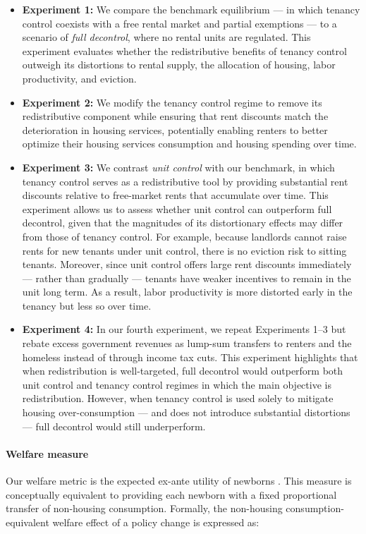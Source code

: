 \documentclass[parskip=full]{article}
\begin{document}
\begin{itemize}
    \item \textbf{Experiment 1:} We compare the benchmark equilibrium — in which tenancy control coexists with a free rental market and partial exemptions — to a scenario of \textit{full decontrol}, where no rental units are regulated. This experiment evaluates whether the redistributive benefits of tenancy control outweigh its distortions to rental supply, the allocation of housing, labor productivity, and eviction.
    \item \textbf{Experiment 2:} We modify the tenancy control regime to remove its redistributive component while ensuring that rent discounts match the deterioration in housing services, potentially enabling renters to better optimize their housing services consumption and housing spending over time.
    \item \textbf{Experiment 3:} We contrast \textit{unit control} with our benchmark, in which tenancy control serves as a redistributive tool by providing substantial rent discounts relative to free-market rents that accumulate over time. This experiment allows us to assess whether unit control can outperform full decontrol, given that the magnitudes of its distortionary effects may differ from those of tenancy control. For example, because landlords cannot raise rents for new tenants under unit control, there is no eviction risk to sitting tenants. Moreover, since unit control offers large rent discounts immediately — rather than gradually — tenants have weaker incentives to remain in the unit long term. As a result, labor productivity is more distorted early in the tenancy but less so over time.
    \item \textbf{Experiment 4:} In our fourth experiment, we repeat Experiments 1--3 but rebate excess government revenues as lump-sum transfers to renters and the homeless instead of through income tax cuts. This experiment highlights that when redistribution is well-targeted, full decontrol would outperform both unit control and tenancy control regimes in which the main objective is redistribution. However, when tenancy control is used solely to mitigate housing over-consumption — and does not introduce substantial distortions — full decontrol would still underperform.
\end{itemize}

\paragraph{Welfare measure} Our welfare metric is the expected ex-ante utility of newborns \citep{ralws-1971,conesa-et-al,gkkoc}. This measure is conceptually equivalent to providing each newborn with a fixed proportional transfer of non-housing consumption. Formally, the non-housing consumption-equivalent welfare effect of a policy change is expressed as:
\end{document}
